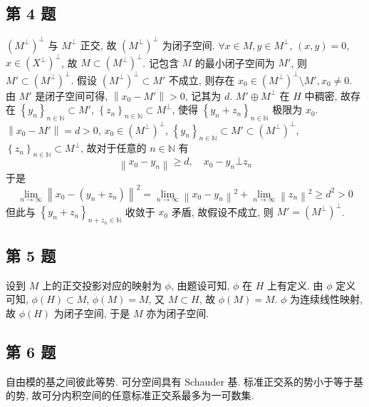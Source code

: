 \documentclass[../main.tex]{subfiles}
\begin{document}
\subsection{第 4 题}
$\left( M^\bot \right)^\bot$ 与 $M^\bot$ 正交, 故 $\left( M^\bot \right)^\bot$ 为闭子空间.
$\forall x \in M, y \in M^\bot$, $\left( x, y \right) = 0$, $x \in \left( X^\bot \right)^\bot$, 故 $M \subset \left( M^\bot \right)^\bot$.
记包含 $M$ 的最小闭子空间为 $M'$, 则 $M' \subset \left( M^\bot \right)^\bot$.
假设 $\left( M^\bot \right)^\bot \subset M'$ 不成立, 则存在 $x_0 \in \left( M^\bot \right)^\bot \setminus M', x_0 \neq 0$.
由 $M'$ 是闭子空间可得, $\left\| x_0 - M' \right\| > 0$, 记其为 $d$.
$M' \oplus M^\bot$ 在 $H$ 中稠密, 故存在 $\left\{ y_n \right\}_{n \in \mathbb{N}} \subset M'$, $\left\{ z_n \right\}_{n \in \mathbb{N}} \subset M^\bot$, 使得 $\left\{ y_n + z_n \right\}_{n \in \mathbb{N}}$ 极限为 $x_0$.
$\left\| x_0 - M' \right\| = d > 0$,
$x_0 \in \left( M^\bot \right)^\bot$,
$\left\{ y_n \right\}_{n \in \mathbb{N}} \subset M' \subset \left( M^\bot \right)^\bot$,
$\left\{ z_n \right\}_{n \in \mathbb{N}} \subset M^\bot$,
故对于任意的 $n \in \mathbb{N}$ 有
\[
    \left\| x_0 - y_n \right\| \geqslant d
    , \quad
    x_0 - y_n \bot z_n
\]
于是
\[
    \lim_{n \to \infty} \left\| x_0 - \left( y_n + z_n \right) \right\|^2
    = \lim_{n \to \infty} \left\| x_0 - y_n \right\|^2  + \lim_{n \to \infty} \left\| z_n \right\|^2
    \geqslant d^2
    > 0
\]
但此与 $\left\{ y_n + z_n \right\}_{n + z_n \in \mathbb{N}}$ 收敛于 $x_0$ 矛盾, 故假设不成立, 则 $M' = \left( M^\bot \right)^\bot$.

\subsection{第 5 题}
设到 $M$ 上的正交投影对应的映射为 $\phi$, 由题设可知, $\phi$ 在 $H$ 上有定义.
由 $\phi$ 定义可知, $\phi \left( H \right) \subset M$, $\phi \left( M \right) = M$,
又 $M \subset H$, 故 $\phi \left( M \right) = M$.
$\phi$ 为连续线性映射, 故 $\phi \left( H \right)$ 为闭子空间, 于是 $M$ 亦为闭子空间.

\subsection{第 6 题}
自由模的基之间彼此等势.
可分空间具有 Schauder 基.
标准正交系的势小于等于基的势, 故可分内积空间的任意标准正交系最多为一可数集.
\end{document}
